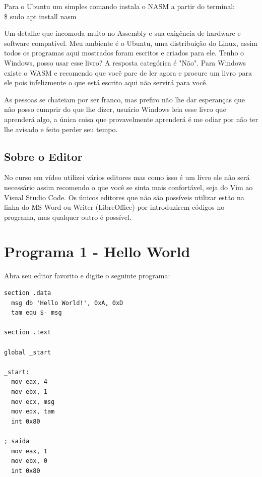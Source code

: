 Para o Ubuntu um simples comando instala o NASM a partir do terminal:\\
{\ttfamily\$ sudo apt install nasm}
\\[2mm]
\begin{dica}
	Um detalhe que incomoda muito no Assembly e sua exigência de hardware e software compatível. Meu ambiente é o Ubuntu, uma distribuição do Linux, assim todos os programas aqui mostrados foram escritos e criados para ele. Tenho o Windows, posso usar esse livro? A resposta categórica é "Não". Para Windows existe o WASM e recomendo que você pare de ler agora e procure um livro para ele pois infelizmente o que está escrito aqui não servirá para você.
\end{dica}

As pessoas se chateiam por ser franco, mas prefiro não lhe dar esperanças que não posso cumprir do que lhe dizer, usuário Windows leia esse livro que aprenderá algo, a única coisa que provavelmente aprenderá é me odiar por não ter lhe avisado e feito perder seu tempo.

\subsection{Sobre o Editor}

No curso em vídeo utilizei vários editores mas como isso é um livro ele não será necessário assim recomendo o que você se sinta mais confortável, seja do Vim ao Visual Studio Code. Os únicos editores que não são possíveis utilizar estão na linha do MS-Word ou Writer (LibreOffice) por introduzirem códigos no programa, mas qualquer outro é possível.

\section{Programa 1 - Hello World}
Abra seu editor favorito e digite o seguinte programa:
\begin{lstlisting}[]
section .data
  msg db 'Hello World!', 0xA, 0xD
  tam equ $- msg

section .text

global _start

_start:
  mov eax, 4
  mov ebx, 1
  mov ecx, msg
  mov edx, tam
  int 0x80

; saida
  mov eax, 1
  mov ebx, 0
  int 0x80
\end{lstlisting}

